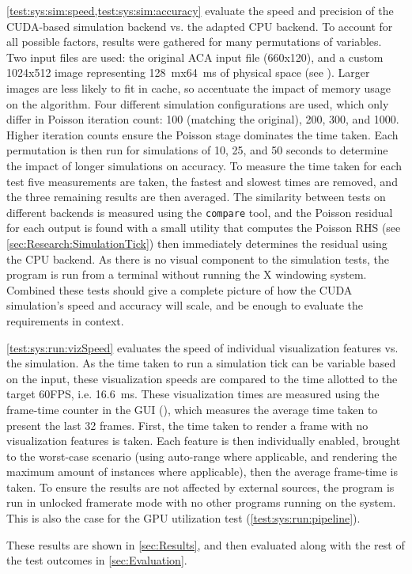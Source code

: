 \cref{test:sys:sim:speed,test:sys:sim:accuracy} evaluate the speed and precision of the CUDA-based simulation backend vs. the adapted CPU backend.
To account for all possible factors, results were gathered for many permutations of variables. 
Two input files are used: the original ACA input file (660x120), and a custom 1024x512 image representing \SI{128}{\metre}x\SI{64}{\metre}s of physical space (see ).
Larger images are less likely to fit in cache, so accentuate the impact of memory usage on the algorithm.
Four different simulation configurations are used, which only differ in Poisson iteration count: 100 (matching the original), 200, 300, and 1000.
Higher iteration counts ensure the Poisson stage dominates the time taken.
Each permutation is then run for simulations of 10, 25, and 50 seconds to determine the impact of longer simulations on accuracy.
To measure the time taken for each test five measurements are taken, the fastest and slowest times are removed, and the three remaining results are then averaged.
The similarity between tests on different backends is measured using the \texttt{compare} tool, and the Poisson residual for each output is found with a small utility that computes the Poisson RHS (see \cref{sec:Research:SimulationTick}) then immediately determines the residual using the CPU backend.
As there is no visual component to the simulation tests, the program is run from a terminal without running the X windowing system.
Combined these tests should give a complete picture of how the CUDA simulation's speed and accuracy will scale, and be enough to evaluate the requirements in context.

\cref{test:sys:run:vizSpeed} evaluates the speed of individual visualization features vs. the simulation.
As the time taken to run a simulation tick can be variable based on the input, these visualization speeds are compared to the time allotted to the target 60FPS, i.e. \SI{16.6}{\milli\second}.
These visualization times are measured using the frame-time counter in the GUI (), which measures the average time taken to present the last 32 frames.
First, the time taken to render a frame with no visualization features is taken.
Each feature is then individually enabled, brought to the worst-case scenario (using auto-range where applicable, and rendering the maximum amount of instances where applicable), then the average frame-time is taken.
To ensure the results are not affected by external sources, the program is run in unlocked framerate mode with no other programs running on the system.
This is also the case for the GPU utilization test (\cref{test:sys:run:pipeline}).

These results are shown in \cref{sec:Results}, and then evaluated along with the rest of the test outcomes in \cref{sec:Evaluation}.